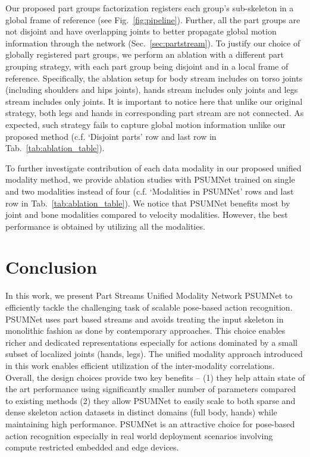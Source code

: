\documentclass[runningheads]{llncs}
\begin{document}
Our proposed part groups factorization registers each group's sub-skeleton in a global frame of reference (see Fig.~\ref{fig:pipeline}). Further, all the part groups are not disjoint and have overlapping joints to better propagate global motion information through the network (Sec.~\ref{sec:partstream}). To justify our choice of globally registered part groups, we perform an ablation with a different part grouping strategy, with each part group being disjoint and in a local frame of reference. Specifically, the ablation setup for body stream includes on  torso joints (including shoulders and hips joints), hands stream includes only  joints and legs stream includes only  joints. It is important to notice here that unlike our original strategy, both legs and hands in corresponding part stream are not connected. As expected, such strategy fails to capture global motion information unlike our proposed method (c.f. `Disjoint parts' row and last row in Tab.~\ref{tab:ablation_table}).

To further investigate contribution of each data modality in our proposed unified modality method, we provide ablation studies with PSUMNet trained on single and two modalities instead of four (c.f. `Modalities in PSUMNet' rows and last row in Tab.~\ref{tab:ablation_table}). We notice that PSUMNet benefits most by joint and bone modalities compared to velocity modalities. However, the best performance is obtained by utilizing all the modalities.



\section{Conclusion}
\label{sec:conclusion}

In this work, we present Part Streams Unified Modality Network PSUMNet to efficiently tackle the challenging task of scalable pose-based action recognition. PSUMNet uses part based streams and avoids treating the input skeleton in monolithic fashion as done by contemporary approaches. This choice enables richer  and dedicated representations especially for actions dominated by a small subset of localized joints (hands, legs). The unified modality approach introduced in this work enables efficient utilization of the inter-modality correlations. Overall, the design choices provide two key benefits -- (1) they help attain state of the art performance using significantly smaller number of parameters compared to existing methods (2) they allow PSUMNet to easily scale to both sparse and dense skeleton action datasets in distinct domains (full body, hands) while maintaining high performance. PSUMNet is an attractive choice for pose-based action recognition especially in real world deployment scenarios involving compute restricted embedded and edge devices.



\end{document}
